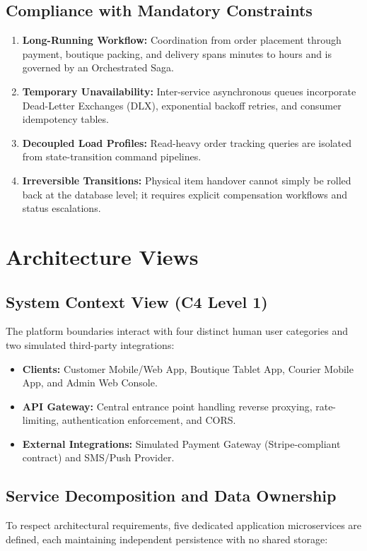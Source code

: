 \documentclass[11pt,a4paper]{article}
\begin{document}
\subsection{Compliance with Mandatory Constraints}
\begin{enumerate}
    \item \textbf{Long-Running Workflow:} Coordination from order placement through payment, boutique packing, and delivery spans minutes to hours and is governed by an Orchestrated Saga.
    \item \textbf{Temporary Unavailability:} Inter-service asynchronous queues incorporate Dead-Letter Exchanges (DLX), exponential backoff retries, and consumer idempotency tables.
    \item \textbf{Decoupled Load Profiles:} Read-heavy order tracking queries are isolated from state-transition command pipelines.
    \item \textbf{Irreversible Transitions:} Physical item handover cannot simply be rolled back at the database level; it requires explicit compensation workflows and status escalations.
\end{enumerate}

\newpage
\section{Architecture Views}

\subsection{System Context View (C4 Level 1)}
The platform boundaries interact with four distinct human user categories and two simulated third-party integrations:
\begin{itemize}
    \item \textbf{Clients:} Customer Mobile/Web App, Boutique Tablet App, Courier Mobile App, and Admin Web Console.
    \item \textbf{API Gateway:} Central entrance point handling reverse proxying, rate-limiting, authentication enforcement, and CORS.
    \item \textbf{External Integrations:} Simulated Payment Gateway (Stripe-compliant contract) and SMS/Push Provider.
\end{itemize}

\subsection{Service Decomposition and Data Ownership}
To respect architectural requirements, five dedicated application microservices are defined, each maintaining independent persistence with no shared storage:
\end{document}
